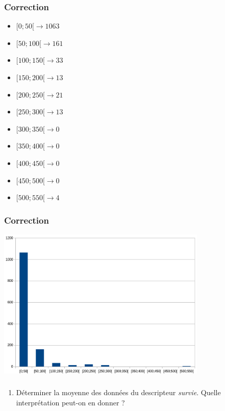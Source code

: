 \documentclass[svgnames,11pt]{beamer}
\begin{document}
\begin{frame}
    \frametitle{Correction}

    \begin{itemize}
        \item $[0;50[ \rightarrow 1063$
        \item $[50;100[ \rightarrow 161$
        \item $[100;150[ \rightarrow 33$
        \item $[150;200[ \rightarrow 13$
        \item $[200;250[ \rightarrow 21$
        \item $[250;300[ \rightarrow 13$
        \item $[300;350[ \rightarrow 0$
        \item $[350;400[ \rightarrow 0$
        \item $[400;450[ \rightarrow 0$
        \item $[450;500[ \rightarrow 0$
        \item $[500;550[ \rightarrow 4$
    \end{itemize}

\end{frame}
\begin{frame}
    \frametitle{Correction}

    \begin{center}
    \centering
    \includegraphics[width=10cm]{ressources/diagramme.png}
    \end{center}

\end{frame}
\begin{frame}
    \frametitle{}

    \begin{activite}
    \begin{enumerate}
        \item Déterminer la moyenne des données du descripteur \emph{survie}. Quelle interprétation peut-on en donner ?
    \end{enumerate}
    \end{activite}

\end{frame}
\end{document}
